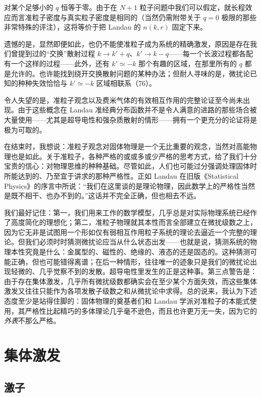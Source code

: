 对某个足够小的 $q$ 恒等于零。由于在 $N+1$ 粒子问题中我们可以假定，就长程效应而言准粒子密度与真实粒子密度是相同的（当然仍需附带关于 $q=0$ 极限的那些非常特殊的评注），这将等价于把 Landau 的 $n(k,r)$ 固定下来。

遗憾的是，显然即便如此，也仍不能使准粒子成为系统的精确激发，原因是存在我们曾提到过的“交换”散射过程 $k \to k'+q$、$k' \to k-q$——每一个长波过程都各配有一个这样的过程——此外，还有 $k' \simeq -k$ 那个有趣的区域，在那里所有的 $q$ 都是允许的。也许能找到绕开交换散射问题的某种办法；但耐人寻味的是，微扰论已知的种种失效恰恰与 $k' \simeq -k$ 区域相联系（76）。

令人失望的是，准粒子观念以及费米气体的有效相互作用的完整论证至今尚未出现。由于这些概念在 Landau 准经典分布函数并不是令人满意的进路的那些场合被大量使用——尤其是超导电性和强杂质散射的情形——拥有一个更充分的论证将是极为可取的。

在结束时，我想说：准粒子观念对固体物理是一个无比重要的观念，当然对高能物理也是如此。关于准粒子，各种严格的或或多或少严格的思考方式，给了我们十分宝贵的信心：对物理思维的种种基础。尽管如此，人们也可能过分强调处理固体时所能达到的、乃至宜于讲求的那种严格性。正如 Landau 在旧版《Statistical Physics》的序言中所说：“我们在这里谈的是理论物理，因此数学上的严格性当然是既不相干、也办不到的。”这话并不完全正确，但也相去不远。

我们最好记住：第一，我们用来工作的数学模型，几乎总是对实际物理系统已经作了高度简化的理想化；第二，准粒子物理就其本性而言全部建立在微扰级数之上，因为它无非是试图用一个形如仅有弱相互作用粒子系统的理论去逼近一个完整的理论。但我们必须时时猜测微扰论应当从什么状态出发——也就是说，猜测系统的物理本性究竟是什么：金属型的、磁性的、绝缘的、液态的还是固态的。这种猜测可能正确，但也可能错得离谱；在后一种情形，往往唯一的迹象只是我们的微扰论出现轻微的、几乎觉察不到的发散。超导电性里发生的正是这种事。第三点警告是：由于存在集体激发，几乎所有微扰级数都确实会在至少某个方面失效，而这些集体激发又往往只能作为各项发散子级数之和从微扰论中求得。总的说来，我认为下述态度至少是站得住脚的：固体物理的奠基者们和 Landau 学派对准粒子的本能式使用，其严格性比起精巧的多体理论几乎毫不逊色，而且也许更万无一失，因为它的\emph{外表}不那么严格。

\section{集体激发}

\subsection{激子}

